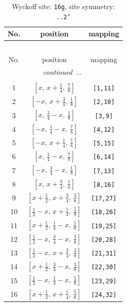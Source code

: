 \documentclass[fleqn,8pt]{jsarticle}
\begin{document}
\renewcommand{\arraystretch}{1.2}
\begin{longtable}{ccc}
\caption{Wyckoff site: {\tt 16g}, site symmetry: {\tt ..2'}}
 \\
 \hline \hline
No. & position & mapping \\ \hline \endfirsthead

\multicolumn{2}{l}{\tablename\ \thetable{}} \\
 \hline \hline
No. & position & mapping \\ \hline \endhead

 \hline \hline
\multicolumn{2}{r}{\footnotesize\it continued ...} \\ \endfoot

 \hline \hline
\multicolumn{2}{r}{} \\ \endlastfoot

1 & $\left[ x,\, x + \frac{1}{4},\, \frac{7}{8} \right]$ & {\tt [1,11]} \\ \hline
2 & $\left[ - x,\, x + \frac{3}{4},\, \frac{1}{8} \right]$ & {\tt [2,10]} \\ \hline
3 & $\left[ x,\, \frac{3}{4} - x,\, \frac{1}{8} \right]$ & {\tt [3,9]} \\ \hline
4 & $\left[ - x,\, \frac{1}{4} - x,\, \frac{7}{8} \right]$ & {\tt [4,12]} \\ \hline
5 & $\left[ - x,\, x + \frac{1}{4},\, \frac{7}{8} \right]$ & {\tt [5,15]} \\ \hline
6 & $\left[ x,\, \frac{1}{4} - x,\, \frac{7}{8} \right]$ & {\tt [6,14]} \\ \hline
7 & $\left[ - x,\, \frac{3}{4} - x,\, \frac{1}{8} \right]$ & {\tt [7,13]} \\ \hline
8 & $\left[ x,\, x + \frac{3}{4},\, \frac{1}{8} \right]$ & {\tt [8,16]} \\ \hline
9 & $\left[ x + \frac{1}{2},\, x + \frac{3}{4},\, \frac{3}{8} \right]$ & {\tt [17,27]} \\ \hline
10 & $\left[ \frac{1}{2} - x,\, x + \frac{1}{4},\, \frac{5}{8} \right]$ & {\tt [18,26]} \\ \hline
11 & $\left[ x + \frac{1}{2},\, \frac{1}{4} - x,\, \frac{5}{8} \right]$ & {\tt [19,25]} \\ \hline
12 & $\left[ \frac{1}{2} - x,\, \frac{3}{4} - x,\, \frac{3}{8} \right]$ & {\tt [20,28]} \\ \hline
13 & $\left[ \frac{1}{2} - x,\, x + \frac{3}{4},\, \frac{3}{8} \right]$ & {\tt [21,31]} \\ \hline
14 & $\left[ x + \frac{1}{2},\, \frac{3}{4} - x,\, \frac{3}{8} \right]$ & {\tt [22,30]} \\ \hline
15 & $\left[ \frac{1}{2} - x,\, \frac{1}{4} - x,\, \frac{5}{8} \right]$ & {\tt [23,29]} \\ \hline
16 & $\left[ x + \frac{1}{2},\, x + \frac{1}{4},\, \frac{5}{8} \right]$ & {\tt [24,32]} \\
\end{longtable}
\end{document}

